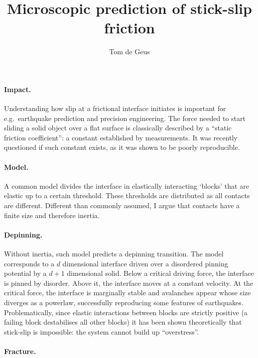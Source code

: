 \documentclass[pagenumbers=false, paragraphafter=none]{goose-article}
\title{Microscopic prediction of stick-slip friction}
\author{Tom de Geus}
\begin{document}
\twocolumn[
    \begin{@twocolumnfalse}
        \maketitle
    \end{@twocolumnfalse}
]
\sloppy

\paragraph{Impact.}

Understanding how slip at a frictional interface initiates is important for e.g.~earthquake prediction and precision engineering.
The force needed to start sliding a solid object over a flat surface is classically described by a ``static friction coefficient'': a constant established by measurements.
It was recently questioned if such constant exists, as it was shown to be poorly reproducible.

\paragraph{Model.}

A common model divides the interface in elastically interacting `blocks' that are elastic up to a certain threshold.
These thresholds are distributed as all contacts are different.
Different than commonly assumed, I argue that contacts have a finite size and therefore inertia.

\paragraph{Depinning.}

Without inertia, such model predicts a depinning transition.
The model corresponds to a $d$ dimensional interface driven over a disordered pinning potential by a $d + 1$ dimensional solid.
Below a critical driving force, the interface is pinned by disorder.
Above it, the interface moves at a constant velocity.
At the critical force, the interface is marginally stable and avalanches appear whose size diverges as a powerlaw, successfully reproducing some features of earthquakes.
Problematically, since elastic interactions between blocks are strictly positive (a failing block destabilises all other blocks) it has been shown theoretically that stick-slip is impossible: the system cannot build up ``overstress''.

\paragraph{Fracture.}
\end{document}
